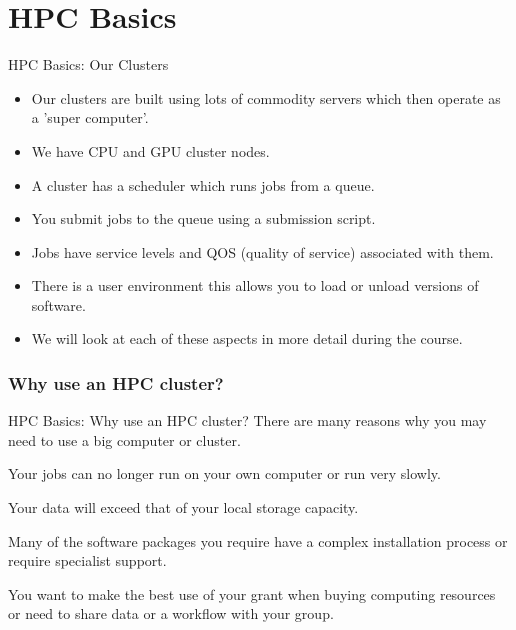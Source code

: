\part{HPC Basics}
\frame{\partpage}

\begin{frame}{HPC Basics: Our Clusters}
\begin{itemize}
\item{Our clusters are built using lots of commodity servers which then operate as a 'super computer'.}
\pause
\item{We have CPU and GPU cluster nodes.}
\pause
\item{A cluster has a scheduler which runs jobs from a queue.}
\pause
\item{You submit jobs to the queue using a submission script.}
\pause
\item{Jobs have service levels and QOS (quality of service) associated with them.}
\pause
\item{There is a user environment this allows you to load or unload versions of software.}
\pause
\item{We will look at each of these aspects in more detail during the course.}
\end{itemize}
\end{frame}

\section{Why use an HPC cluster?}
\begin{frame}{HPC Basics: Why use an HPC cluster?}
There are many reasons why you may need to use a big computer or cluster. 
\begin{description}
\pause
\item[\textit{Limited local resources:}]{Your jobs can no longer run on your own computer or run very slowly.}
\pause
\item[\textit{Storage Intensive:}]{Your data will exceed that of your local storage capacity.}
\pause
\item[\textit{Software:}]{Many of the software packages you require have a complex installation process or require specialist support.}
\pause
\item[\textit{Grants and sharing:}]{You want to make the best use of your grant when buying computing resources or need to share data or a workflow with your group.}
\end{description}
\end{frame}

